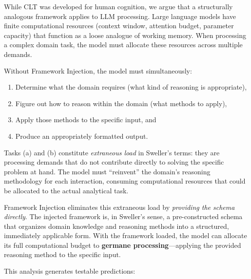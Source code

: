 \documentclass[12pt,a4paper]{article}
\begin{document}
While CLT was developed for human cognition, we argue that a structurally analogous framework applies to LLM processing. Large language models have finite computational resources (context window, attention budget, parameter capacity) that function as a loose analogue of working memory. When processing a complex domain task, the model must allocate these resources across multiple demands.

Without Framework Injection, the model must simultaneously:
\begin{enumerate}[label=(\alph*)]
    \item Determine what the domain requires (what kind of reasoning is appropriate),
    \item Figure out how to reason within the domain (what methods to apply),
    \item Apply those methods to the specific input, and
    \item Produce an appropriately formatted output.
\end{enumerate}

Tasks (a) and (b) constitute \emph{extraneous load} in Sweller's terms: they are processing demands that do not contribute directly to solving the specific problem at hand. The model must ``reinvent'' the domain's reasoning methodology for each interaction, consuming computational resources that could be allocated to the actual analytical task.

Framework Injection eliminates this extraneous load by \emph{providing the schema directly}. The injected framework is, in Sweller's sense, a pre-constructed schema that organizes domain knowledge and reasoning methods into a structured, immediately applicable form. With the framework loaded, the model can allocate its full computational budget to \textbf{germane processing}---applying the provided reasoning method to the specific input.

This analysis generates testable predictions:
\end{document}
